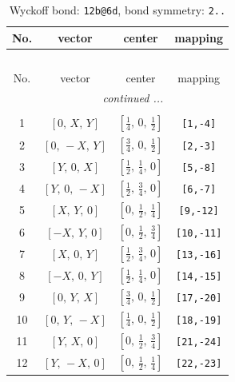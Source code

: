 \documentclass[fleqn,8pt]{jsarticle}
\begin{document}
\renewcommand{\arraystretch}{1.2}
\begin{longtable}{cccc}
\caption{Wyckoff bond: {\tt 12b@6d}, bond symmetry: {\tt 2..}}
 \\
 \hline \hline
No. & vector & center & mapping \\ \hline \endfirsthead

\multicolumn{3}{l}{\tablename\ \thetable{}} \\
 \hline \hline
No. & vector & center & mapping \\ \hline \endhead

 \hline \hline
\multicolumn{3}{r}{\footnotesize\it continued ...} \\ \endfoot

 \hline \hline
\multicolumn{3}{r}{} \\ \endlastfoot

1 & $\left[ 0,\, X,\, Y \right]$ & $\left[ \frac{1}{4},\, 0,\, \frac{1}{2} \right]$ & {\tt [1,-4]} \\ \hline
2 & $\left[ 0,\, - X,\, Y \right]$ & $\left[ \frac{3}{4},\, 0,\, \frac{1}{2} \right]$ & {\tt [2,-3]} \\ \hline
3 & $\left[ Y,\, 0,\, X \right]$ & $\left[ \frac{1}{2},\, \frac{1}{4},\, 0 \right]$ & {\tt [5,-8]} \\ \hline
4 & $\left[ Y,\, 0,\, - X \right]$ & $\left[ \frac{1}{2},\, \frac{3}{4},\, 0 \right]$ & {\tt [6,-7]} \\ \hline
5 & $\left[ X,\, Y,\, 0 \right]$ & $\left[ 0,\, \frac{1}{2},\, \frac{1}{4} \right]$ & {\tt [9,-12]} \\ \hline
6 & $\left[ - X,\, Y,\, 0 \right]$ & $\left[ 0,\, \frac{1}{2},\, \frac{3}{4} \right]$ & {\tt [10,-11]} \\ \hline
7 & $\left[ X,\, 0,\, Y \right]$ & $\left[ \frac{1}{2},\, \frac{3}{4},\, 0 \right]$ & {\tt [13,-16]} \\ \hline
8 & $\left[ - X,\, 0,\, Y \right]$ & $\left[ \frac{1}{2},\, \frac{1}{4},\, 0 \right]$ & {\tt [14,-15]} \\ \hline
9 & $\left[ 0,\, Y,\, X \right]$ & $\left[ \frac{3}{4},\, 0,\, \frac{1}{2} \right]$ & {\tt [17,-20]} \\ \hline
10 & $\left[ 0,\, Y,\, - X \right]$ & $\left[ \frac{1}{4},\, 0,\, \frac{1}{2} \right]$ & {\tt [18,-19]} \\ \hline
11 & $\left[ Y,\, X,\, 0 \right]$ & $\left[ 0,\, \frac{1}{2},\, \frac{3}{4} \right]$ & {\tt [21,-24]} \\ \hline
12 & $\left[ Y,\, - X,\, 0 \right]$ & $\left[ 0,\, \frac{1}{2},\, \frac{1}{4} \right]$ & {\tt [22,-23]} \\
\end{longtable}
\end{document}
